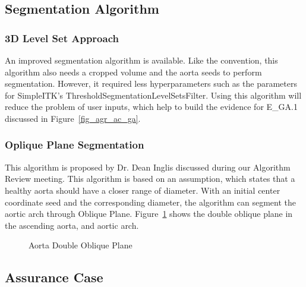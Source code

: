 \subsection{Segmentation Algorithm}

\subsubsection{3D Level Set Approach}
An improved segmentation algorithm \cite{6346433} is available. Like the convention, this algorithm also needs a cropped volume and the aorta seeds to perform segmentation. However, it required less hyperparameters such as the parameters for SimpleITK's ThresholdSegmentationLevelSetsFilter. Using this algorithm will reduce the problem of user inputs, which help to build the evidence for E\_GA.1 discussed in Figure~\ref{fig_agr_ac_ga}.

\subsubsection{Oplique Plane Segmentation}
This algorithm is proposed by Dr. Dean Inglis discussed during our Algorithm Review meeting. This algorithm is based on an assumption, which states that a healthy aorta should have a closer range of diameter. With an initial center coordinate seed and the corresponding diameter, the algorithm can segment the aortic arch through Oblique Plane. Figure~\ref{fig_oblique} shows the double oblique plane in the ascending aorta, and aortic arch.

\begin{figure}[H]
    \centering
    \caption[Aorta Double Oblique Plane]{Aorta Double Oblique Plane}
    \label{fig_oblique}
\end{figure}

\subsection{Assurance Case}

